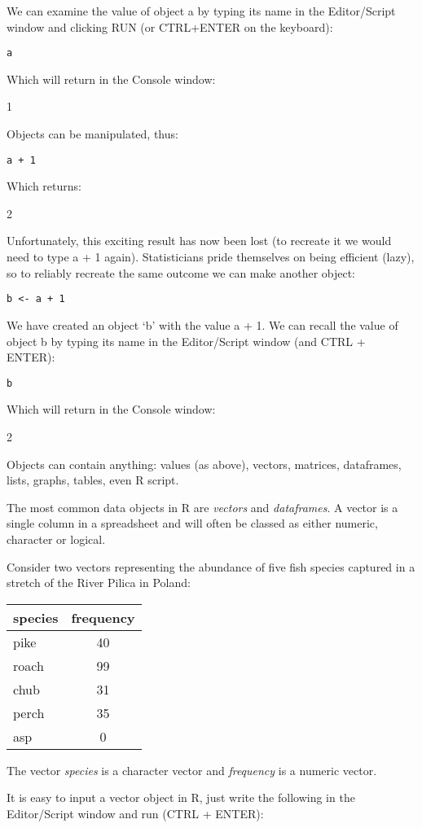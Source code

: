 \documentclass[
]{book}
\begin{document}
We can examine the value of object a by typing its name in the
Editor/Script window and clicking RUN (or CTRL+ENTER on the keyboard):

\texttt{a}

Which will return in the Console window:

1

Objects can be manipulated, thus:

\texttt{a\ +\ 1}

Which returns:

2

Unfortunately, this exciting result has now been lost (to recreate it we
would need to type a + 1 again). Statisticians pride themselves on being
efficient (lazy), so to reliably recreate the same outcome we can make
another object:

\texttt{b\ \textless{}-\ a\ +\ 1}

We have created an object `b' with the value a + 1. We can recall the
value of object b by typing its name in the Editor/Script window (and
CTRL + ENTER):

\texttt{b}

Which will return in the Console window:

2

Objects can contain anything: values (as above), vectors, matrices,
dataframes, lists, graphs, tables, even R script.

The most common data objects in R are \emph{vectors} and
\emph{dataframes}. A vector is a single column in a spreadsheet and will
often be classed as either numeric, character or logical.

Consider two vectors representing the abundance of five fish species
captured in a stretch of the River Pilica in Poland:

\begin{longtable}[]{@{}lc@{}}
\toprule
species & frequency \\
\midrule
\endhead
pike & 40 \\
roach & 99 \\
chub & 31 \\
perch & 35 \\
asp & 0 \\
\bottomrule
\end{longtable}

The vector \emph{species} is a character vector and \emph{frequency} is
a numeric vector.

It is easy to input a vector object in R, just write the following in
the Editor/Script window and run (CTRL + ENTER):
\end{document}
